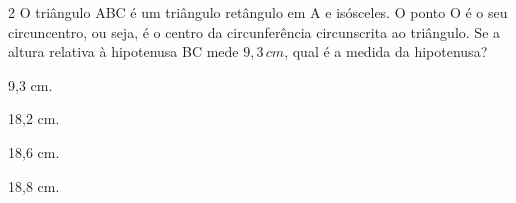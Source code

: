 





\num{2} O triângulo ABC é um triângulo retângulo em A e isósceles. O ponto O
é o seu circuncentro, ou seja, é o centro da circunferência circunscrita
ao triângulo. Se a altura relativa à hipotenusa BC mede $9,3\,cm$, qual é a
medida da hipotenusa?


\begin{escolha}[itemsep=0pt]
\item 9,3 cm.
\item 18,2 cm.
\item 18,6 cm.
\item 18,8 cm.
\end{escolha}








